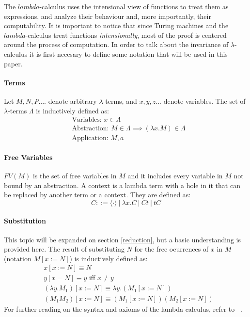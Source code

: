 \documentclass[12pt]{article}
\begin{document}
The $lambda$-calculus uses the intensional view of functions to treat them as expressions, and analyze their behaviour and, more importantly, their computability. It is important to notice that since Turing machines and the $lambda$-calculus treat functions \textit{intensionally}, most of the proof is centered around the process of computation.
In order to talk about the invariance of $\lambda$-calculus it is first necesary to define some notation that will be used in this paper.
\paragraph{Terms} Let $M, N, P....$ denote arbitrary $\lambda$-terms, and $x,y,z...$ denote variables. The set of $\lambda$-terms $\Lambda$ is inductively defined as:
\begin{equation}
  \begin{split}
  & \text{Variables: } x \in \Lambda \\
  & \text{Abstraction: } M \in \Lambda \implies ( \lambda x.M ) \in \Lambda \\
  & \text{Application: } M, a
  \end{split}
\end{equation}

\paragraph{Free Variables} $FV(M)$ is the set of free variables in $M$ and it includes every variable in $M$ not bound by an abstraction.
A context is a lambda term with a hole in it that can be replaced by another term or a context. They are defined as:
\begin{equation}
C ::= \langle \cdot \rangle \ | \ \lambda x.C \ | \ Ct \ | \ tC
\end{equation}
\paragraph{Substitution} This topic will be expanded on section \ref{reduction}, but a basic understanding is provided here.
The result of substituting $N$ for the free ocurrences of $x$ in $M$ (notation $M[x:= N]$) is inductively defined as:
\begin{equation}
  \begin{split}
    & x [x := N] \equiv N \\
    & y [ x=N ] \equiv y \text{ iff } x \neq y \\
    & (\lambda y.M_{1})[ x:=N ] \equiv \lambda y. ( M_{1} [ x:=N ] ) \\
    & (M_{1}M_{2})[x:=N] \equiv (M_{1}[x:=N])(M_{2}[x:=N])
  \end{split}
\end{equation}
For further reading on the syntax and axioms of the lambda calculus, refer to ~\cite{barendregt1984lambda}.
\end{document}
